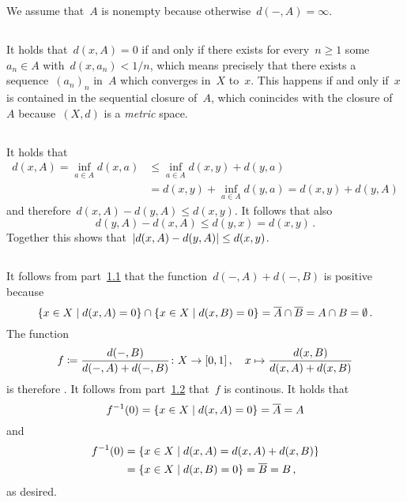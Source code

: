 \section{}


We assume that~$A$ is nonempty because otherwise~$d(-,A) = \infty$.



\subsection{}
\label{distance for closed}

It holds that~$d(x,A) = 0$ if and only if there exists for every~$n \geq 1$ some~$a_n \in A$ with~$d(x,a_n) < 1/n$, which means precisely that there exists a sequence~$(a_n)_n$ in~$A$ which converges in~$X$ to~$x$.
This happens if and only if~$x$ is contained in the sequential closure of~$A$, which conincides with the closure of~$A$ because~$(X,d)$ is a \emph{metric} space.





\subsection{}
\label{distance is lipschitz}

It holds that
\begin{align*}
          d(x,A)
   =      \inf_{a \in A} d(x,a)
  &\leq   \inf_{a \in A} d(x,y) + d(y,a)  \\
  &=      d(x,y) + \inf_{a \in A} d(y,a)
   =      d(x,y) + d(y,A)
\end{align*}
and therefore~$d(x,A) - d(y,A) \leq d(x,y)$.
It follows that also
\[
        d(y,A) - d(x,A) 
  \leq  d(y,x)
  =     d(x,y) \,.
\]
Together this shows that~$\lvert d(x,A) - d(y,A) \rvert \leq d(x,y)$.





\subsection{}

It follows from part~\ref{distance for closed} that the function~$d(-,A) + d(-,B)$ is positive because
\[
    \{x \in X \suchthat d(x,A) = 0\} \cap \{x \in X \suchthat d(x,B) = 0\}
  = \closure{A} \cap \closure{B}
  = A \cap B
  = \emptyset \,.
\]
The function
\[
            f
  \coloneqq  \frac{d(-,B)}{d(-,A) + d(-,B)}
  \colon    X
  \to       [0,1] \,,
  \quad     x
  \mapsto   \frac{d(x,B)}{d(x,A) + d(x,B)}
\]
is therefore {\welldef}.
It follows from part~\ref{distance is lipschitz} that~$f$ is continous.
It holds that
\[
    f^{-1}(0)
  = \{
      x \in X
    \suchthat
      d(x,A) = 0
    \}
  = \closure{A}
  = A
\]
and
\begin{align*}
      f^{-1}(0)
  &=  \{
        x \in X
      \suchthat
        d(x,A) = d(x,A) + d(x,B)
      \}  \\
  &=  \{
        x \in X
      \suchthat
        d(x,B) = 0
      \}
  =   \closure{B}
  =   B \,,
\end{align*}
as desired.




